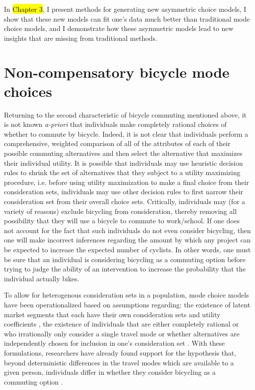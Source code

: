 \documentclass{article}
\begin{document}
In \hl{Chapter 3}, I present methods for generating new asymmetric choice models, I show that these new models can fit one's data much better than traditional mode choice models, and I demonstrate how these asymmetric models lead to new insights that are missing from traditional methods.

\section{Non-compensatory bicycle mode choices}
\label{sec:irrational_choices}
Returning to the second characteristic of bicycle commuting mentioned above, it is not known \textit{a-priori} that individuals make completely rational choices of whether to commute by bicycle. Indeed, it is not clear that individuals perform a comprehensive, weighted comparison of all of the attributes of each of their possible commuting alternatives and then select the alternative that maximizes their individual utility. It is possible that individuals may use heuristic decision rules to shrink the set of alternatives that they subject to a utility maximizing procedure, i.e. before using utility maximization to make a final choice from their consideration sets, individuals may use other decision rules to first narrow their consideration set from their overall choice sets. Critically, individuals may (for a variety of reasons) exclude bicycling from consideration, thereby removing all possibility that they will use a bicycle to commute to work/school. If one does not account for the fact that such individuals do not even consider bicycling, then one will make incorrect inferences regarding the amount by which any project can be expected to increase the expected number of cyclists. In other words, one must be sure that an individual is considering bicycling as a commuting option before trying to judge the ability of an intervention to increase the probability that the individual actually bikes.

To allow for heterogenous consideration sets in a population, mode choice models have been operationalized based on assumptions regarding: the existence of latent market segments that each have their own consideration sets and utility coefficients \citep{vij_incorporating_2013, vij_preference_2014}, the existence of individuals that are either completely rational or who irrationally only consider a single travel mode \citep{swait_incorporating_1987} or whether alternatives are independently chosen for inclusion in one's consideration set \citep{swait_empirical_1987, swait_choice_2001, swait_choice_2009}. With these formulations, researchers have already found support for the hypothesis that, beyond deterministic differences in the travel modes which are available to a given person, individuals differ in whether they consider bicycling as a commuting option \citep{swait_choice_2009, vij_preference_2014, mahmoud_latent_2015}.
\end{document}
